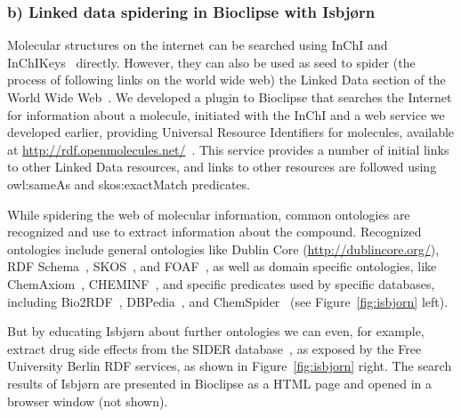 \documentclass[10pt]{bmc_article}
\newenvironment{bmcformat}{\fussy\setboolean{publ}{true}}{\fussy}
\begin{document}
\begin{bmcformat}
\subsubsection*{b) Linked data spidering in Bioclipse with Isbjørn}

Molecular structures on the internet can be searched using InChI and InChIKeys~\cite{Coles2005} directly.
However, they can also be used as seed to spider (the process of following links on the world wide web)
the Linked Data section of the World Wide Web~\cite{Samwald2011}. We developed a plugin to Bioclipse
that searches the Internet for information about a molecule, initiated with the InChI and a web service
we developed earlier, providing Universal Resource Identifiers for molecules, available
at \url{http://rdf.openmolecules.net/}~\cite{Willighagen2011}. This
service provides a number of initial links to other Linked Data resources, and links to other
resources are followed using owl:sameAs and skos:exactMatch predicates.

While spidering the web of molecular information, common ontologies are recognized and use to extract
information about the compound. Recognized ontologies include general ontologies like
Dublin Core (\url{http://dublincore.org/}), RDF Schema~\cite{Guha:04:RVD}, SKOS~\cite{Bechhofer:09:SSK},
and FOAF~\cite{Grav07}, as well as domain specific ontologies, like
ChemAxiom~\cite{Adams2009}, CHEMINF~\cite{Hastings2011}, and specific predicates
used by specific databases, including Bio2RDF~\cite{Belleau2008}, DBPedia~\cite{DBPEDIA},
and ChemSpider~\cite{Pence2010} (see Figure~\ref{fig:isbjorn} left).

But by educating Isbjørn about further ontologies we can even, for example, extract drug side effects
from the SIDER database~\cite{Kuhn2010}, as exposed by the Free University Berlin RDF services,
as shown in Figure~\ref{fig:isbjorn} right. The search results of Isbjørn are presented in Bioclipse
as a HTML page and opened in a browser window (not shown).


\end{bmcformat}
\end{document}
